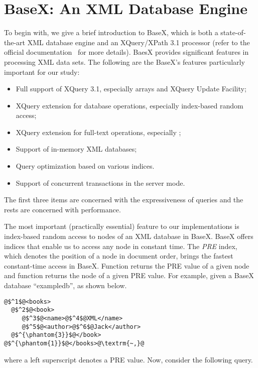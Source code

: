 \section{BaseX: An XML Database Engine}
\label{sect:basex}

To begin with, we give a brief introduction to BaseX, which is both a
state-of-the-art XML database engine and an XQuery/XPath 3.1 processor (refer to the
official documentation~\cite{basex864} for more details). BaesX provides
significant features in processing XML data sets. The following are the BaseX's
features particularly important for our study:

\begin{itemize}
	\item Full support of XQuery 3.1, especially arrays and XQuery Update Facility;
	\item XQuery extension for database operations, especially index-based
	random access;
	\item XQuery extension for full-text operations, especially
	;
	\item Support of in-memory XML databases;
	\item Query optimization based on various indices.
	\item Support of concurrent transactions in the server mode.
\end{itemize}


The first three items are concerned with the expressiveness of queries and the
rests are concerned with performance.

The most important (practically essential) feature to our implementations is
index-based random access to nodes of an XML database in BaseX. BaseX offers
indices that enable us to access any node in constant time. The \emph{PRE}
index, which denotes the position of a node in document order, brings the
fastest constant-time access in BaseX. Function  returns the
PRE value of a given node and function  returns the node of a
given PRE value. For example, given a BaseX database ``exampledb'', as shown
below.

\begin{lstlisting}[escapechar=\@]
@$^1$@<books>
  @$^2$@<book>
	 @$^3$@<name>@$^4$@XML</name>
	 @$^5$@<author>@$^6$@Jack</author>
  @$^{\phantom{3}}$@</book>
@$^{\phantom{1}}$@</books>@\textrm{~,}@
\end{lstlisting}

where a left superscript denotes a PRE value. Now, consider the following query.

